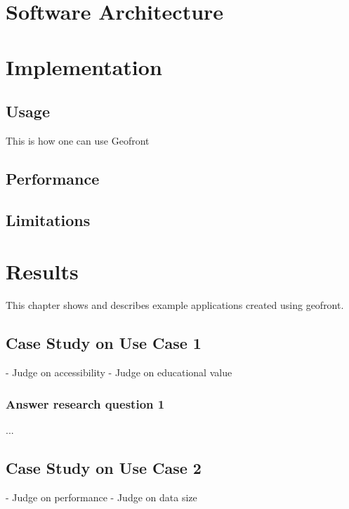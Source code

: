 
\chapter{Software Architecture}



\chapter{Implementation}%


\section{Usage}%

This is how one can use Geofront

\section{Performance}%

\section{Limitations}%


\chapter{Results}%
This chapter shows and describes example applications created using geofront.

\section{Case Study on Use Case 1}%
- Judge on accessibility
- Judge on educational value

\subsection*{Answer research question 1}

...

\section{Case Study on Use Case 2}%
- Judge on performance
- Judge on data size

